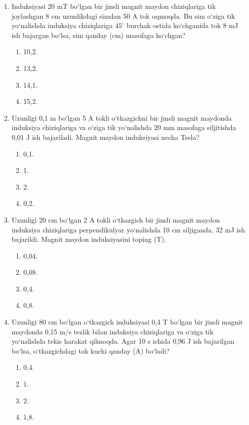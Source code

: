 \begin{enumerate}
\item Induksiyasi 20 mT bo‘lgan bir jinsli magnit maydon chiziqlariga tik joylashgan 8 cm uzunlikdagi simdan 50 A tok oqmoqda. Bu sim o‘ziga tik yo‘nalishda induksiya chiziqlariga $45^\circ$ burchak ostida ko‘chganida tok 8 mJ ish bajargan bo‘lsa, sim qanday (cm) masofaga ko‘chgan?
\begin{enumerate}[label=\Alph*)]
\item 10,2.
\item 13,2.
\item 14,1.
\item 15,2.
\end{enumerate}

\item Uzunligi 0,1 m bo‘lgan 5 A tokli o‘tkazgichni bir jinsli magnit maydonda induksiya chiziqlariga va o‘ziga tik yo‘nalishda 20 mm masofaga siljitishda 0,01 J ish bajariladi. Magnit maydon induksiyasi necha Tesla?
\begin{enumerate}[label=\Alph*)]
\item 0,1.
\item 1.
\item 2.
\item 0,2.
\end{enumerate}

\item Uzunligi 20 cm bo‘lgan 2 A tokli o‘tkazgich bir jinsli magnit maydon induksiya chiziqlariga perpendikulyar yo‘nalishda 10 cm siljiganda, 32 mJ ish bajarildi. Magnit maydon induksiyasini toping (T).
\begin{enumerate}[label=\Alph*)]
\item 0,04.
\item 0,08.
\item 0,4.
\item 0,8.
\end{enumerate}

\item Uzunligi 80 cm bo‘lgan o‘tkazgich induksiyasi 0,4 T bo‘lgan bir jinsli magnit maydonda 0,15 m/s tezlik bilan induksiya chiziqlariga va o‘ziga tik yo‘nalishda tekis harakat qilmoqda. Agar 10 s ichida 0,96 J ish bajarilgan bo‘lsa, o‘tkazgichdagi tok kuchi qanday (A) bo‘ladi?
\begin{enumerate}[label=\Alph*)]
\item 0,4.
\item 1.
\item 2.
\item 1,8.
\end{enumerate}


\end{enumerate}
